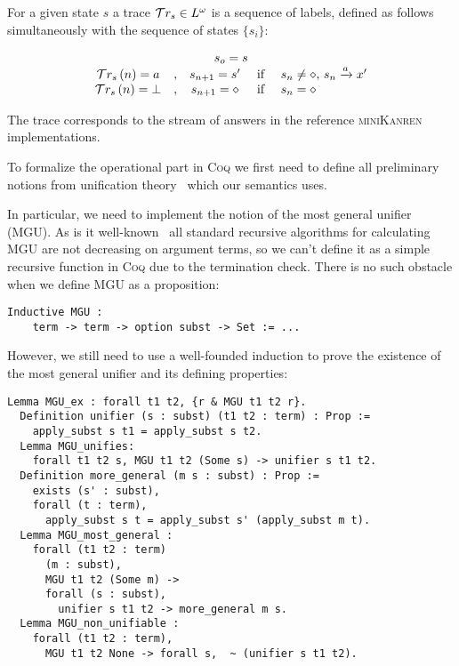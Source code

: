 For a given state $s$ a trace $\mathcal{T}r_{s}\in L^\omega$ is a sequence of labels, defined as follows simultaneously with the sequence of states $\{s_i\}$:

\[
\begin{array}{ccccl}
  \multicolumn{5}{c}{s_o=s}\\
  \tr{s}\,(n)=a &,& s_{n+1}=s'&\mbox{ if }& s_n\ne\diamond,\, s_n\xrightarrow{a} x'\\
  \tr{s}\,(n)=\bot&,&s_{n+1}=\diamond&\mbox{ if }& s_n=\diamond
\end{array}
\]

The trace corresponds to the stream of answers in the reference \textsc{miniKanren} implementations.

To formalize the operational part in \textsc{Coq} we first need to define all preliminary notions from unification theory~\cite{Unification} which our semantics uses.

In particular, we need to implement the notion of the most general unifier (MGU). As is it well-known~\cite{UnificationMcBride} all standard recursive algorithms for calculating
MGU are not decreasing on argument terms, so we can't define it as a simple recursive function in \textsc{Coq} due to the termination check. There is no such obstacle when we define
MGU as a proposition:

\begin{lstlisting}[language=Coq,basicstyle=\footnotesize]
  Inductive MGU :
    term -> term -> option subst -> Set := ...
\end{lstlisting}

However, we still need to use a well-founded induction to prove the existence of the most general unifier and its defining properties:

\begin{lstlisting}[language=Coq,basicstyle=\footnotesize]
  Lemma MGU_ex : forall t1 t2, {r & MGU t1 t2 r}.
  Definition unifier (s : subst) (t1 t2 : term) : Prop :=
    apply_subst s t1 = apply_subst s t2.
  Lemma MGU_unifies:
    forall t1 t2 s, MGU t1 t2 (Some s) -> unifier s t1 t2.
  Definition more_general (m s : subst) : Prop :=
    exists (s' : subst),
    forall (t : term),
      apply_subst s t = apply_subst s' (apply_subst m t).
  Lemma MGU_most_general :
    forall (t1 t2 : term)
      (m : subst),
      MGU t1 t2 (Some m) ->
      forall (s : subst),
        unifier s t1 t2 -> more_general m s.
  Lemma MGU_non_unifiable :
    forall (t1 t2 : term),
      MGU t1 t2 None -> forall s,  ~ (unifier s t1 t2).
\end{lstlisting}

